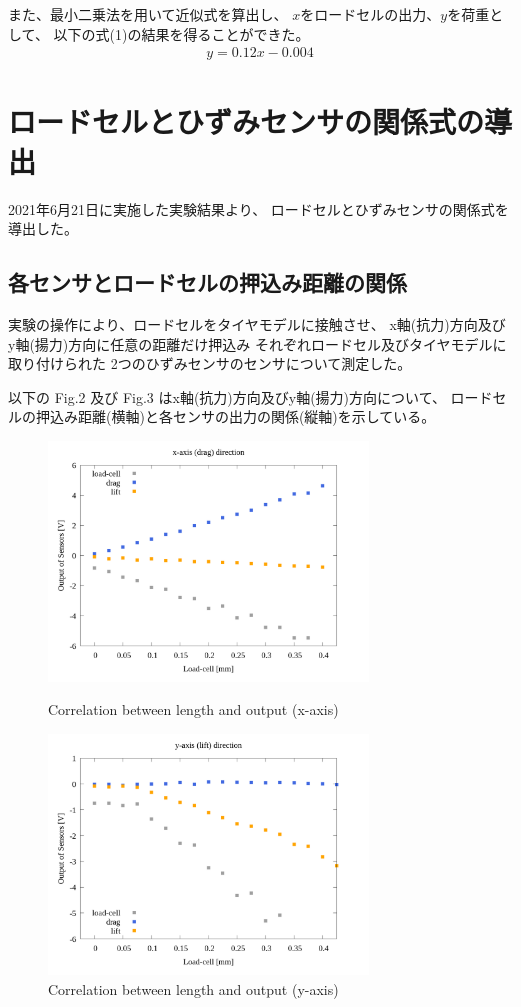 \documentclass[twocolumn,a4j]{jsarticle}
\begin{document}
また、最小二乗法を用いて近似式を算出し、
$x$をロードセルの出力、$y$を荷重として、
以下の式(1)の結果を得ることができた。
\begin{eqnarray}
    y = 0.12 x - 0.004
\end{eqnarray}

\newpage

\section{ロードセルとひずみセンサの関係式の導出}
2021年6月21日に実施した実験結果より、
ロードセルとひずみセンサの関係式を導出した。\\

\subsection{各センサとロードセルの押込み距離の関係}
実験の操作により、ロードセルをタイヤモデルに接触させ、
x軸(抗力)方向及びy軸(揚力)方向に任意の距離だけ押込み
それぞれロードセル及びタイヤモデルに取り付けられた
2つのひずみセンサのセンサについて測定した。\par
以下の Fig.2 及び Fig.3 はx軸(抗力)方向及びy軸(揚力)方向について、
ロードセルの押込み距離(横軸)と各センサの出力の関係(縦軸)を示している。
\begin{figure}[htbp]
    \footnotesize
    \begin{center}
        \includegraphics[width=85mm]{images/03_length-output_x.png}
        \caption{Correlation between length and output (x-axis)}
        \includegraphics[width=85mm]{images/04_length-output_y.png}
        \caption{Correlation between length and output (y-axis)}
    \end{center}
\end{figure}
\end{document}
